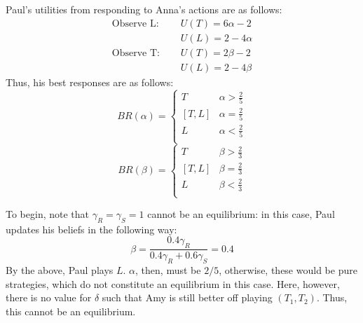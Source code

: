 \documentclass[11pt]{article}
\begin{document}
\begin{enumerate}
	Paul's utilities from responding to Anna's actions are as follows:
	\begin{align*}
	\text{Observe L: }\quad &U(T) = 6\alpha - 2 \\
	& U(L) = 2 - 4\alpha \\
	\text{Observe T: } \quad &U(T) = 2\beta - 2 \\
	&U(L) = 2 - 4\beta
	\end{align*}
	Thus, his best responses are as follows: 
	\[BR(\alpha) = \begin{cases}
	T & \alpha > \frac{2}{5} \\
	[T,L] & \alpha = \frac{2}{5} \\
	L & \alpha < \frac{2}{5} \\
	\end{cases} \]%
	\[BR(\beta) = \begin{cases}
	T & \beta > \frac{2}{3} \\
	[T,L] & \beta = \frac{2}{3} \\
	L & \beta < \frac{2}{3} \\
	\end{cases} \]
	
	To begin, note that $ \gamma_R = \gamma_S = 1 $ cannot be an equilibrium: in this case, Paul updates his beliefs in the following way: 
	\[\beta = \frac{0.4\gamma_R}{0.4\gamma_R + 0.6\gamma_S} = 0.4\]
	By the above, Paul plays $ L $. $\alpha$, then, must be $ 2/5 $, otherwise, these would be pure strategies, which do not constitute an equilibrium in this case. Here, however, there is no value for $\delta$ such that Amy is still better off playing $ (T_1, T_2) $. Thus, this cannot be an equilibrium.
	

\end{enumerate}
\end{document}
